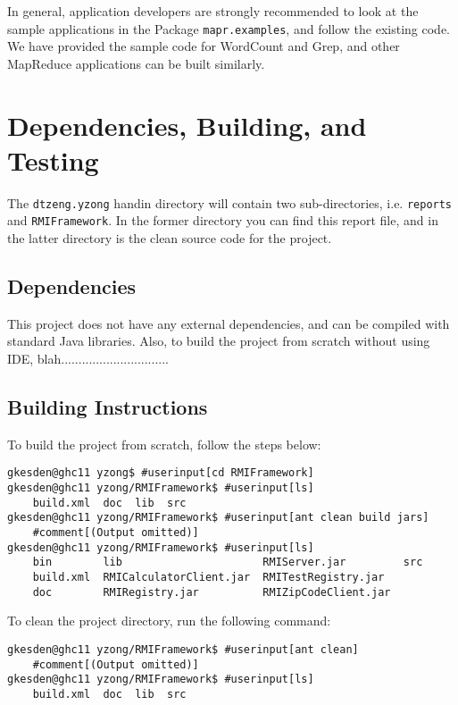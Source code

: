 \documentclass{article} %
\begin{document}
\par\qquad In general, application developers are strongly recommended to look at the sample applications in the Package \texttt{mapr.examples}, and follow the existing code. We have provided the sample code for WordCount and Grep, and other MapReduce applications can be built similarly.

\section{Dependencies, Building, and Testing}

\par\qquad The \texttt{dtzeng.yzong} handin directory will contain two sub-directories, i.e. \texttt{reports} and \texttt{RMIFramework}. In the former directory you can find this report file, and in the latter directory is the clean source code for the project.

\subsection{Dependencies}

\par\qquad This project does not have any external dependencies, and can be compiled with standard Java libraries. Also, to build the project from scratch without using IDE, blah...............................

\subsection{Building Instructions}

\par\qquad To build the project from scratch, follow the steps below:

\begin{Verbatim}[commandchars=\#\[\]]
gkesden@ghc11 yzong$ #userinput[cd RMIFramework]
gkesden@ghc11 yzong/RMIFramework$ #userinput[ls]
    build.xml  doc  lib  src
gkesden@ghc11 yzong/RMIFramework$ #userinput[ant clean build jars]
    #comment[(Output omitted)]
gkesden@ghc11 yzong/RMIFramework$ #userinput[ls]
    bin        lib                      RMIServer.jar         src
    build.xml  RMICalculatorClient.jar  RMITestRegistry.jar
    doc        RMIRegistry.jar          RMIZipCodeClient.jar

\end{Verbatim}

\par\qquad To clean the project directory, run the following command:
\begin{Verbatim}[commandchars=\#\[\]]
gkesden@ghc11 yzong/RMIFramework$ #userinput[ant clean]
    #comment[(Output omitted)]
gkesden@ghc11 yzong/RMIFramework$ #userinput[ls]
    build.xml  doc  lib  src
\end{Verbatim}
\end{document}

